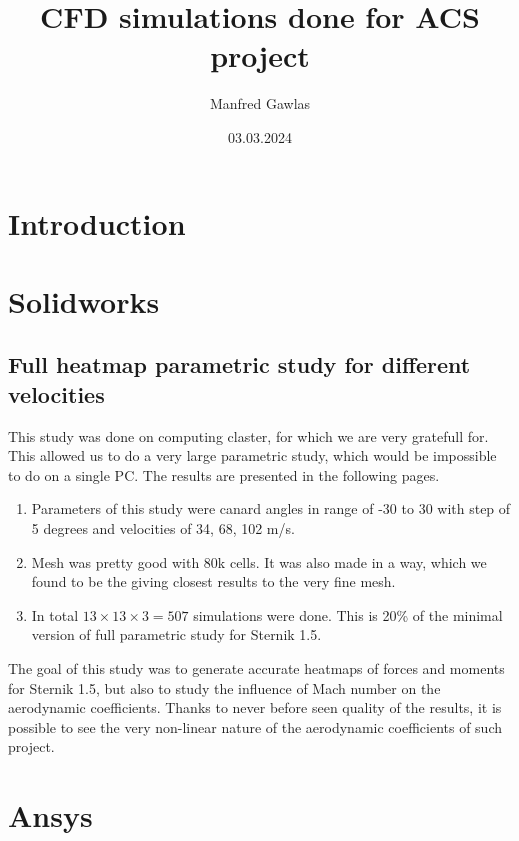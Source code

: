 \documentclass{report}
\title{CFD simulations done for ACS project}
\author{Manfred Gawlas}
\date{03.03.2024}
\begin{document}
\maketitle

\tableofcontents

\chapter{Introduction}


\chapter{Solidworks}

\section{Full heatmap parametric study for different velocities}
This study was done on computing claster, for which we are very gratefull for. This
allowed us to do a very large parametric study, which would be impossible to do on a single
PC. The results are presented in the following pages.
\begin{enumerate}
    \item Parameters of this study were canard angles in range of -30 to 30 with step of 5 degrees and
    velocities of 34, 68, 102 m/s. 
    \item Mesh was pretty good with 80k cells. It was also made in a way, which we 
    found to be the giving closest results to the very fine mesh.
    \item In total $13 \times 13 \times 3 = 507$ simulations were done. This is 20\% of the 
    minimal version of full parametric study for Sternik 1.5.
\end{enumerate}
The goal of this study was to generate accurate heatmaps of forces and moments for Sternik 1.5, 
but also to study the influence of Mach number on the aerodynamic coefficients. Thanks 
to never before seen quality of the results, it is possible to see the very non-linear 
nature of the aerodynamic coefficients of such project.




\chapter{Ansys}

\end{document}
